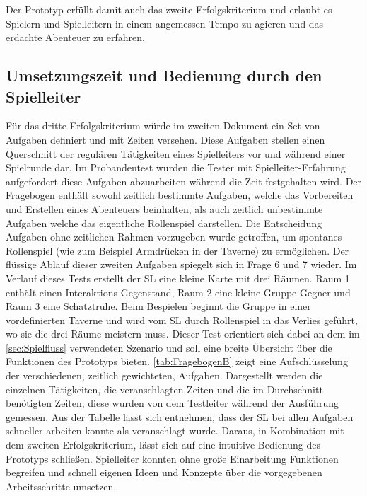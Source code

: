Der Prototyp erfüllt damit auch das zweite Erfolgskriterium und erlaubt es Spielern und Spielleitern in einem angemessen Tempo zu agieren und das erdachte Abenteuer zu erfahren.




\subsection{Umsetzungszeit und Bedienung durch den Spielleiter}
\label{sec:UmsetzungszeitUndBedienungDurchDenSpielleiter}
Für das dritte Erfolgskriterium würde im zweiten Dokument ein Set von Aufgaben definiert und mit Zeiten versehen. Diese Aufgaben stellen einen Querschnitt der regulären Tätigkeiten eines Spielleiters vor und während einer Spielrunde dar. Im Probandentest wurden die Tester mit Spielleiter-Erfahrung aufgefordert diese Aufgaben abzuarbeiten während die Zeit festgehalten wird. Der Fragebogen enthält sowohl zeitlich bestimmte Aufgaben, welche das Vorbereiten und Erstellen eines Abenteuers beinhalten, als auch zeitlich unbestimmte Aufgaben welche das eigentliche Rollenspiel darstellen. Die Entscheidung Aufgaben ohne zeitlichen Rahmen vorzugeben wurde getroffen, um spontanes Rollenspiel (wie zum Beispiel Armdrücken in der Taverne) zu ermöglichen. Der flüssige Ablauf dieser zweiten Aufgaben spiegelt sich in Frage 6 und 7 wieder. Im Verlauf dieses Tests erstellt der SL eine kleine Karte mit drei Räumen. Raum 1 enthält einen Interaktions-Gegenstand, Raum 2 eine kleine Gruppe Gegner und Raum 3 eine Schatztruhe.\newline
Beim Bespielen beginnt die Gruppe in einer vordefinierten Taverne und wird vom SL durch Rollenspiel in das Verlies geführt, wo sie die drei Räume meistern muss. Dieser Test orientiert sich dabei an dem im \ref{sec:Spielfluss} verwendeten Szenario und soll eine breite Übersicht über die Funktionen des Prototyps bieten.\newline
\ref{tab:FragebogenB} zeigt eine Aufschlüsselung der verschiedenen, zeitlich gewichteten, Aufgaben. Dargestellt werden die einzelnen Tätigkeiten, die veranschlagten Zeiten und die im Durchschnitt benötigten Zeiten, diese wurden von dem Testleiter während der Ausführung gemessen. Aus der Tabelle lässt sich entnehmen, dass der SL bei allen Aufgaben schneller arbeiten konnte als veranschlagt wurde. Daraus, in Kombination mit dem zweiten Erfolgskriterium, lässt sich auf eine intuitive Bedienung des Prototyps schließen. Spielleiter konnten ohne große Einarbeitung Funktionen begreifen und schnell eigenen Ideen und Konzepte über die vorgegebenen Arbeitsschritte umsetzen. 
